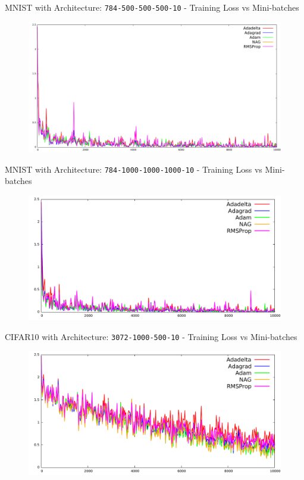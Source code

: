 \documentclass[10pt]{beamer}
\begin{document}
\begin{frame}{MNIST with Architecture: \texttt{784-500-500-500-10} - Training Loss vs Mini-batches}
\begin{figure}
\centering
\includegraphics[width=\linewidth]{./images/mnist-1.pdf}
\end{figure}
\end{frame}

\begin{frame}{MNIST with Architecture: \texttt{784-1000-1000-1000-10} - Training Loss vs Mini-batches}
\begin{figure}
\centering
\includegraphics[width=\linewidth]{./images/mnist-2.pdf}
\end{figure}
\end{frame}

\begin{frame}{CIFAR10 with Architecture: \texttt{3072-1000-500-10} - Training Loss vs Mini-batches}
\begin{figure}
\centering
\includegraphics[width=\linewidth]{./images/cifar10-1.pdf}
\end{figure}
\end{frame}
\end{document}
